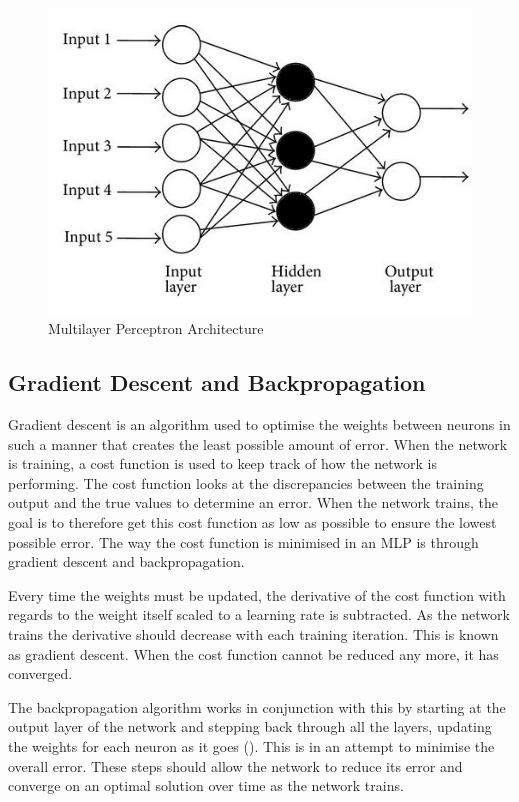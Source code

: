 \documentclass[12pt]{report}
\begin{document}
\vspace{0.5cm}
\begin{figure}[ht!]
	\centering
	\includegraphics[width=12cm]{mlp}
	\caption{Multilayer Perceptron Architecture}
	\label{fig:mlp}
\end{figure}

\subsection{Gradient Descent and Backpropagation}
\begin{flushleft}
Gradient descent is an algorithm used to optimise the weights between neurons in such a manner that creates the least possible amount of error. When the network is training, a cost function is used to keep track of how the network is performing. The cost function looks at the discrepancies between the training output and the true values to determine an error. When the network trains, the goal is to therefore get this cost function as low as possible to ensure the lowest possible error. The way the cost function is minimised in an MLP is through gradient descent and backpropagation.

Every time the weights must be updated, the derivative of the cost function with regards to the weight itself scaled to a learning rate is subtracted. As the network trains the derivative should decrease with each training iteration. This is known as gradient descent. When the cost function cannot be reduced any more, it has converged.

The backpropagation algorithm works in conjunction with this by starting at the output layer of the network and stepping back through all the layers, updating the weights for each neuron as it goes (\cite{rumelhart1985learning}). This is in an attempt to minimise the overall error. These steps should allow the network to reduce its error and converge on an optimal solution over time as the network trains.
\end{flushleft}
\end{document}
